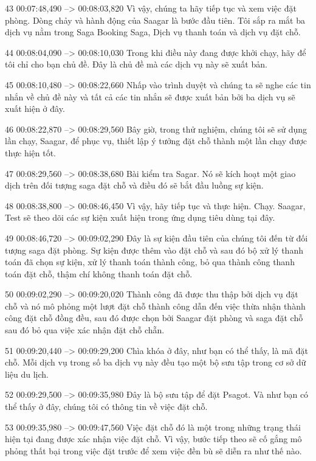 43
00:07:48,490 --> 00:08:03,820
Vì vậy, chúng ta hãy tiếp tục và xem việc đặt phòng.  Dòng chảy và hành động của Saagar là bước đầu tiên.  Tôi sắp ra mắt ba dịch vụ nằm trong Saga Booking Saga, Dịch vụ thanh toán và dịch vụ đặt chỗ.

44
00:08:04,090 --> 00:08:10,030
Trong khi điều này đang được khởi chạy, hãy để tôi chỉ cho bạn chủ đề.  Đây là chủ đề mà các dịch vụ này sẽ xuất bản.

45
00:08:10,480 --> 00:08:22,660
Nhấp vào trình duyệt và chúng ta sẽ nghe các tin nhắn về chủ đề này và tất cả các tin nhắn sẽ được xuất bản bởi ba dịch vụ sẽ xuất hiện ở đây.

46
00:08:22,870 --> 00:08:29,560
Bây giờ, trong thử nghiệm, chúng tôi sẽ sử dụng lần chạy, Saagar, để phục vụ, thiết lập ý tưởng đặt chỗ thành một lần chạy được thực hiện tốt.

47
00:08:29,560 --> 00:08:38,680
Bài kiểm tra Sagar.  Nó sẽ kích hoạt một giao dịch trên đối tượng saga đặt chỗ và điều đó sẽ bắt đầu luồng sự kiện.

48
00:08:38,800 --> 00:08:46,450
Vì vậy, hãy tiếp tục và thực hiện.  Chạy.  Saagar, Test sẽ theo dõi các sự kiện xuất hiện trong ứng dụng tiêu dùng tại đây.

49
00:08:46,720 --> 00:09:02,290
Đây là sự kiện đầu tiên của chúng tôi đến từ đối tượng saga đặt phòng.  Sự kiện được thêm vào đặt chỗ và sau đó bộ xử lý thanh toán đã chọn sự kiện, xử lý thanh toán thành công, bỏ qua thành công thanh toán đặt chỗ, thậm chí không thanh toán đặt chỗ.

50
00:09:02,290 --> 00:09:20,020
Thành công đã được thu thập bởi dịch vụ đặt chỗ và nó mô phỏng một lượt đặt chỗ thành công dẫn đến việc thừa nhận thành công đặt chỗ đồng đều, sau đó được chọn bởi Saagar đặt phòng và saga đặt chỗ sau đó bỏ qua việc xác nhận đặt chỗ chẵn.

51
00:09:20,440 --> 00:09:29,200
Chìa khóa ở đây, như bạn có thể thấy, là mã đặt chỗ.  Mỗi dịch vụ trong số ba dịch vụ này đều tạo một bộ sưu tập trong cơ sở dữ liệu du lịch.

52
00:09:29,500 --> 00:09:35,980
Đây là bộ sưu tập để đặt Psagot.  Và như bạn có thể thấy ở đây, chúng tôi có thông tin về việc đặt chỗ.

53
00:09:35,980 --> 00:09:47,560
Việc đặt chỗ đó là một trong những trạng thái hiện tại đang được xác nhận việc đặt chỗ.  Vì vậy, bước tiếp theo sẽ cố gắng mô phỏng thất bại trong việc đặt trước để xem việc đền bù sẽ diễn ra như thế nào.

